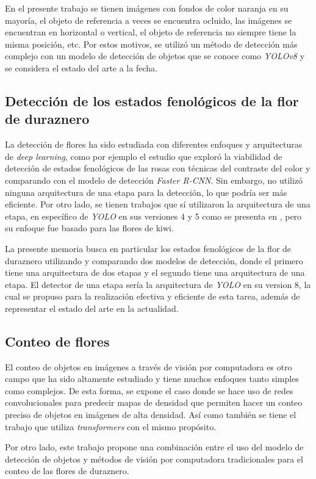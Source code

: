 En el presente trabajo se tienen imágenes con fondos de color naranja en su mayoría, el objeto de referencia a veces se encuentra ocluido, las imágenes se encuentran en horizontal o vertical, el objeto de referencia no siempre tiene la misma posición, etc. Por estos motivos, se utilizó un método de detección más complejo con un modelo de detección de objetos que se conoce como \textit{YOLOv8} y se considera el estado del arte a la fecha.

\subsection{Detección de los estados fenológicos de la flor de duraznero}
 
La detección de flores ha sido estudiada con diferentes enfoques y arquitecturas de \textit{deep learning}, como por ejemplo el estudio \cite{ARTICLE:3} que exploró la viabilidad de detección de estados fenológicos de las rosas con técnicas del contraste del color y comparando con el modelo de detección \textit{Faster R-CNN}. Sin embargo, no utilizó ninguna arquitectura de una etapa para la detección, lo que podría ser más eficiente. Por otro lado, se tienen trabajos que sí utilizaron la arquitectura de una etapa, en específico de \textit{YOLO} en sus versiones 4 y 5 como se presenta en \cite{ARTICLE:4} \cite{ARTICLE:5}, pero su enfoque fue basado para las flores de kiwi.

La presente memoria busca en particular los estados fenológicos de la flor de duraznero utilizando y comparando dos modelos de detección, donde el primero tiene una arquitectura de dos etapas y el segundo tiene una arquitectura de una etapa. El detector de una etapa sería la arquitectura de \textit{YOLO} en su version 8, la cual se propuso para la realización efectiva y eficiente de esta tarea, además de representar el estado del arte en la actualidad.

\subsection{Conteo de flores}

El conteo de objetos en imágenes a través de visión por computadora es otro campo que ha sido altamente estudiado y tiene muchos enfoques tanto simples como complejos. De esta forma, se expone el caso \cite{ARTICLE:6} donde se hace uso de redes convolucionales para predecir mapas de densidad que permiten hacer un conteo preciso de objetos en imágenes de alta densidad. Así como también se tiene el trabajo \cite{ARTICLE:7} que utiliza \textit{transformers} con el mismo propósito.

Por otro lado, este trabajo propone una combinación entre el uso del modelo de detección de objetos y métodos de visión por computadora tradicionales para el conteo de las flores de duraznero.






